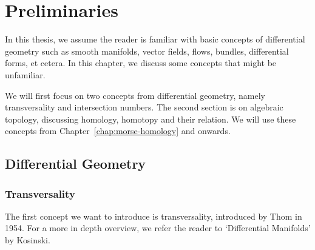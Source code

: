 \setcounter{chapter}{-1}
\chapter{Preliminaries}

In this thesis, we assume the reader is familiar with basic concepts of differential geometry such as smooth manifolds, vector fields, flows, bundles, differential forms, et cetera.
In this chapter, we discuss some concepts that might be unfamiliar.

We will first focus on two concepts from differential geometry, namely transversality and intersection numbers.
The second section is on algebraic topology, discussing homology, homotopy and their relation. We will use these concepts from Chapter~\ref{chap:morse-homology} and onwards.

\section*{Differential Geometry}
\subsection*{Transversality}
The first concept we want to introduce is transversality, introduced by Thom in 1954.
For a more in depth overview, we refer the reader to `Differential Manifolds' by Kosinski.

